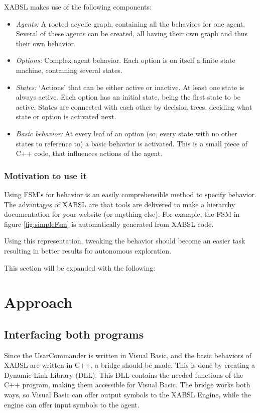 \documentclass[a4paper,10pt]{article}
\begin{document}
\begin{multicols}{2}
XABSL makes use of the following components:
\begin{itemize}
\item \emph{Agents:} A rooted acyclic graph, containing all the behaviors for one
agent. Several of these agents can be created, all having their own graph and
thus their own behavior.
\item \emph{Options:} Complex agent behavior. Each option is on itself a finite
state machine, containing several states.
\item \emph{States:} `Actions' that can be either active or inactive. At least
one state is always active. Each option has an initial state, being the first
state to be active. States are connected with each other by decision trees,
deciding what state or option is activated next.
\item \emph{Basic behavior:} At every leaf of an option (so, every state with no
other states to reference to) a basic behavior is activated. This is a small
piece of C++ code, that influences actions of the agent. 
\end{itemize}



\subsubsection{Motivation to use it}
Using FSM's for behavior is an easily comprehensible method to specify behavior.
The advantages of XABSL are that tools are delivered to make a hierarchy
documentation for your website (or anything else). For example, the FSM in
figure \ref{fig:simpleFsm} is automatically generated from XABSL code.

Using this representation, tweaking the behavior should become an easier task
resulting in better results for autonomous exploration.

This section will be expanded with the following: 

\section{Approach}

\subsection{Interfacing both programs}
Since the UsarCommander is written in Visual Basic, and the basic behaviors of
XABSL are written in C++, a bridge should be made. This is done by creating a
Dynamic Link Library (DLL). This DLL contains the needed functions of the C++
program, making them accessible for Visual Basic. The bridge works both ways, so
Visual Basic can offer output symbols to the XABSL Engine, while the engine can
offer input symbols to the agent.


\end{multicols}
\end{document}
